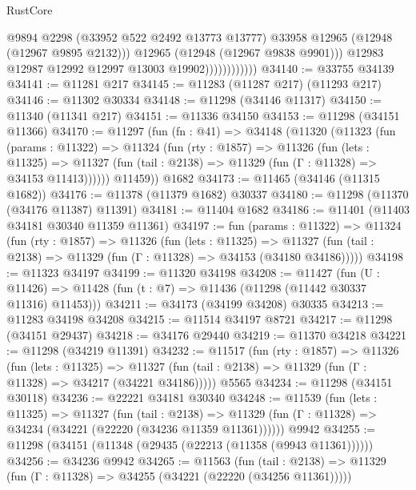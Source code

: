 \begin{lexlean}{RustCore}
\begin{coremodule}
                                @9894
                                @2298
                                (@33952 @522 @2492 @13773 @13777)
                                @33958
                                @12965
                                (@12948 (@12967 @9895 @2132)))
                              @12965
                              (@12948 (@12967 @9838 @9901)))
                            @12983
                            @12987
                            @12992
                            @12997
                            @13003
                            @19902))))))))))))
@34140 := @33755 @34139
@34141 := @11281 @217
@34145 := @11283 (@11287 @217) (@11293 @217)
@34146 := @11302 @30334
@34148 := @11298 (@34146 @11317)
@34150 := @11340 (@11341 @217)
@34151 := @11336 @34150
@34153 := @11298 (@34151 @11366)
@34170 := @11297
    (fun (fn : @41) =>
    @34148
      (@11320
        (@11323
          (fun (params : @11322) =>
          @11324
            (fun (rty : @1857) =>
            @11326
              (fun (lets : @11325) =>
              @11327 (fun (tail : @2138) => @11329 (fun (Γ : @11328) => @34153 @11413))))))
        @11459))
    @1682
@34173 := @11465 (@34146 (@11315 @1682))
@34176 := @11378 (@11379 @1682) @30337
@34180 := @11298 (@11370 (@34176 @11387) @11391)
@34181 := @11404 @1682
@34186 := @11401 (@11403 @34181 @30340 @11359 @11361)
@34197 := fun (params : @11322) =>
  @11324
    (fun (rty : @1857) =>
    @11326
      (fun (lets : @11325) =>
      @11327 (fun (tail : @2138) => @11329 (fun (Γ : @11328) => @34153 (@34180 @34186)))))
@34198 := @11323 @34197
@34199 := @11320 @34198
@34208 := @11427
    (fun (U : @11426) => @11428 (fun (t : @7) => @11436 (@11298 (@11442 @30337 @11316) @11453)))
@34211 := @34173 (@34199 @34208) @30335
@34213 := @11283 @34198 @34208
@34215 := @11514 @34197 @8721
@34217 := @11298 (@34151 @29437)
@34218 := @34176 @29440
@34219 := @11370 @34218
@34221 := @11298 (@34219 @11391)
@34232 := @11517
    (fun (rty : @1857) =>
    @11326
      (fun (lets : @11325) =>
      @11327 (fun (tail : @2138) => @11329 (fun (Γ : @11328) => @34217 (@34221 @34186)))))
    @5565
@34234 := @11298 (@34151 @30118)
@34236 := @22221 @34181 @30340
@34248 := @11539
    (fun (lets : @11325) =>
    @11327
      (fun (tail : @2138) =>
      @11329 (fun (Γ : @11328) => @34234 (@34221 (@22220 (@34236 @11359 @11361))))))
    @9942
@34255 := @11298 (@34151 (@11348 (@29435 (@22213 (@11358 (@9943 @11361))))))
@34256 := @34236 @9942
@34265 := @11563
    (fun (tail : @2138) => @11329 (fun (Γ : @11328) => @34255 (@34221 (@22220 (@34256 @11361)))))

\end{coremodule}
\end{lexlean}
